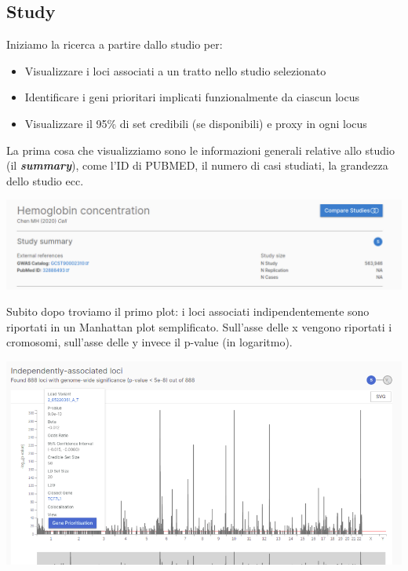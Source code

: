 \documentclass{article}
\begin{document}
\subsection{Study}
\begin{box4}
    [title={\textbf{Ricerca per Studio}}]
    {Iniziamo la ricerca a partire dallo studio per:
    \begin{itemize}
        \item Visualizzare i loci associati a un tratto nello studio selezionato
        \item Identificare i geni prioritari implicati funzionalmente da ciascun locus
        \item Visualizzare il 95\% di set credibili (se disponibili) e proxy in ogni locus
    \end{itemize}}
\end{box4}
La prima cosa che visualizziamo sono le informazioni generali relative allo studio (il \textit{\textbf{summary}}), come l'ID di PUBMED, il numero di casi studiati, la grandezza dello studio ecc.
\begin{center}
    \includegraphics[width=1\textwidth]{figures/4-Study.png}
\end{center}
Subito dopo troviamo il primo plot: i loci associati indipendentemente sono riportati in un Manhattan plot semplificato. Sull'asse delle x vengono riportati i cromosomi, sull'asse delle y invece il p-value (in logaritmo).
\begin{center}
    \includegraphics[width=1\textwidth]{figures/5-Study.png}
\end{center}
\end{document}
